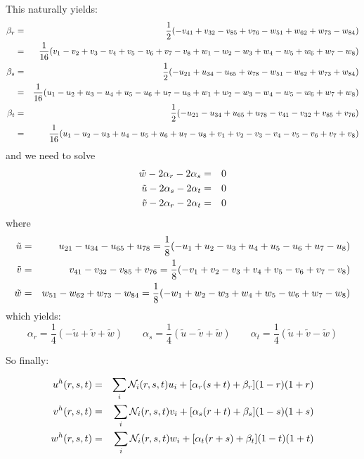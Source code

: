 This naturally yields:
\begin{eqnarray}
\beta_r
&=& \frac{1}{2} ( -v_{41} +v_{32} -v_{85} + v_{76} - w_{51} + w_{62} + w_{73} -w_{84}  ) \nonumber\\
&=& \frac{1}{16} (v_1-v_2+v_3-v_4+v_5-v_6+v_7-v_8  +w_1-w_2 - w_3 + w_4 - w_5 + w_6 +w_7  - w_8    )  \nonumber\\
\beta_s&=& \frac{1}{2} ( -u_{21} +u_{34} -u_{65} + u_{78} - w_{51} - w_{62} + w_{73} +w_{84}  ) \nonumber\\
&=& \frac{1}{16} (u_1-u_2+u_3-u_4+u_5-u_6+u_7-u_8  +w_1 + w_2 - w_3 - w_4 - w_5 - w_6 +w_7 + w_8   )  \nonumber\\
\beta_t&=& \frac{1}{2} ( -u_{21} -u_{34} +u_{65} + u_{78} - v_{41} - v_{32} + v_{85} +v_{76}   ) \nonumber\\
&=& \frac{1}{16} ( u_1-u_2-u_3+u_4 -u_5 + u_6 + u_7 - u_8 +v_1 +v_2 - v_3 - v_4 - v_5 - v_6 + v_7 + v_8  )  \nonumber
\end{eqnarray}
and we need to solve
\begin{eqnarray}
\tilde{w} -2\alpha_r -2\alpha_s&=&0\nonumber\\
\tilde{u} -2\alpha_s -2\alpha_t&=&0\nonumber\\
\tilde{v} -2\alpha_r -2\alpha_t&=&0\nonumber
\end{eqnarray}
where
\begin{eqnarray}
\tilde{u} 
&=& u_{21} -u_{34} -u_{65} + u_{78} 
=\frac{1}{8}(-u_1 + u_2-u_3+u_4 + u_5-u_6 + u_7-u_8  )
\nonumber\\
\tilde{v} 
&=& v_{41} -v_{32} -v_{85} + v_{76}
= \frac{1}{8} (-v_1 + v_2 - v_3 + v_4 + v_5 - v_6 + v_7 - v_8    )
  \nonumber\\ 
\tilde{w} 
&=&  w_{51} -w_{62} +w_{73} - w_{84} 
=\frac{1}{8} (-w_1+w_2-w_3+w_4 + w_5 - w_6 + w_7 -w_8  )
\nonumber
\end{eqnarray}
which yields:
\[
\alpha_r=\frac{1}{4} ( -\tilde{u} + \tilde{v} + \tilde{w} ) 
\quad\quad
\alpha_s=\frac{1}{4} ( \tilde{u} - \tilde{v} + \tilde{w} ) 
\quad\quad
\alpha_t=\frac{1}{4} ( \tilde{u} + \tilde{v} - \tilde{w} ) 
\]

So finally:

\begin{eqnarray}
u^h(r,s,t)&=&\sum_i {\mathcal{N}}_i(r,s,t) u_i + [\alpha_r (s+t) +\beta_r](1-r)(1+r) \nonumber\\
v^h(r,s,t)&=&\sum_i {\mathcal{N}}_i(r,s,t) v_i + [\alpha_s (r+t) +\beta_s](1-s)(1+s) \nonumber\\
w^h(r,s,t)&=&\sum_i {\mathcal{N}}_i(r,s,t) w_i + [\alpha_t (r+s) +\beta_t](1-t)(1+t) \nonumber
\end{eqnarray}


